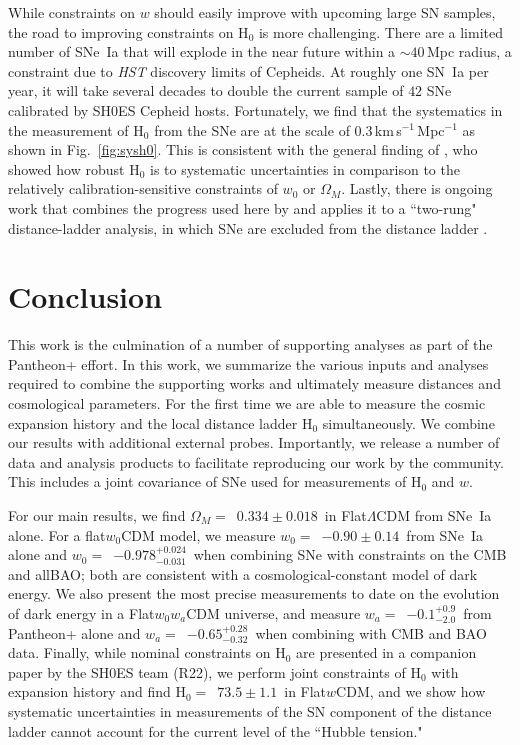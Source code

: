 \documentclass[twocolumn]{aastex63}
\def\fLCDMOMPan{$0.334\pm0.018$}
\def\wPanSH{$-0.90\pm 0.14$}
\def\HPanSH{$73.5\pm1.1$}
\def\wPanPlanckBAO{$-0.978^{+0.024}_{-0.031}$}
\def\wwawaPan{$-0.1^{+0.9}_{-2.0}$}
\def\wwawaPanPlanckBAO{$-0.65^{+0.28}_{-0.32}$}
\begin{document}
While constraints on $w$ should easily improve with upcoming large SN samples, the road to improving constraints on H$_0$ is more challenging. {There are a limited number of SNe~Ia that will explode in the near future within a $\sim40$\,Mpc radius, a constraint due to {\it HST} discovery limits of Cepheids.} At roughly one SN~Ia per year, it will take several decades to double the current sample of $42$ SNe calibrated by SH0ES Cepheid hosts. Fortunately, we find that the systematics in the measurement of H$_0$ from the SNe are at the scale of 0.3\,km\,s$^{-1}$\,Mpc$^{-1}$ as shown in Fig.~\ref{fig:sysh0}. This is consistent with the general finding of \cite{brownsberger21}, who showed how robust H$_0$ is to systematic uncertainties in comparison to the relatively calibration-sensitive constraints of $w_0$ or $\Omega_M$. Lastly, there is ongoing work that combines the progress used here by \cite{peterson21} and applies it to a ``two-rung" distance-ladder analysis, in which SNe are excluded from the distance ladder \citep{kenworthy22}.




\section{Conclusion}
\label{sec:Conclusions}

This work is the culmination of a number of supporting analyses as part of the Pantheon+ effort. In this work, we summarize the various inputs and analyses required to combine the supporting works and ultimately measure distances and cosmological parameters. For the first time we are able to measure the cosmic expansion history and the local distance ladder H$_0$ simultaneously. We combine our results with additional external probes. Importantly, we release a number of data and analysis products {to facilitate reproducing our work by the community}. This includes a joint covariance of SNe used for measurements of H$_0$ and $w$.  

For our main results, we find $\Omega_M=$~\fLCDMOMPan\ in Flat$\Lambda$CDM from SNe~Ia alone. For a flat$w_0$CDM model, we measure $w_0=$~\wPanSH\ from SNe~Ia alone and $w_0=$~\wPanPlanckBAO\ when combining SNe with constraints on the CMB and allBAO; both are consistent with a cosmological-constant model of dark energy.  We also present the most precise measurements to date on the evolution of dark energy in a Flat$w_0w_a$CDM universe, and measure $w_a=$~\wwawaPan\ from Pantheon+ alone and $w_a=$~\wwawaPanPlanckBAO\ when combining with CMB and BAO data. Finally, while nominal constraints on H$_0$ are presented in a companion paper by the SH0ES team (R22), we perform joint constraints of H$_0$ with expansion history and find H$_0=$~\HPanSH\ in Flat$w$CDM, and we show how systematic uncertainties in measurements of the SN component of the distance ladder cannot account for the current level of the ``Hubble tension."
\end{document}
